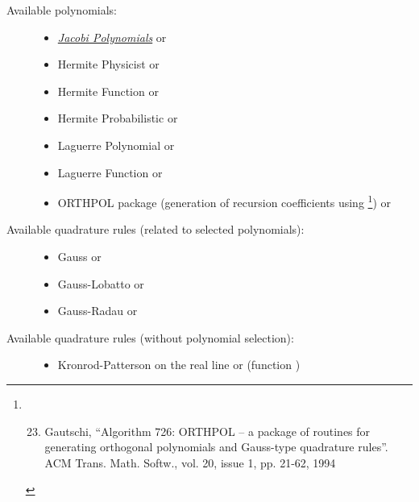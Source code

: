 \documentclass[letterpaper,10pt,english]{sphinxmanual}
\begin{document}
\begin{description}
\item[{Available polynomials:}] \leavevmode\begin{itemize}
\item {} 
{\hyperref[index:ref-jacobi]{\emph{Jacobi Polynomials}}} or 

\item {} 
Hermite Physicist or 

\item {} 
Hermite Function or 

\item {} 
Hermite Probabilistic or 

\item {} 
Laguerre Polynomial or 

\item {} 
Laguerre Function or 

\item {} 
ORTHPOL package (generation of recursion coefficients using \footnote{\begin{enumerate}
\setcounter{enumi}{22}
\item {} 
Gautschi, ``Algorithm 726: ORTHPOL -- a package of routines for generating orthogonal polynomials and Gauss-type quadrature rules''. ACM Trans. Math. Softw., vol. 20, issue 1, pp. 21-62, 1994

\end{enumerate}
})  or 

\end{itemize}

\item[{Available quadrature rules (related to selected polynomials):}] \leavevmode\begin{itemize}
\item {} 
Gauss or 

\item {} 
Gauss-Lobatto or 

\item {} 
Gauss-Radau or 

\end{itemize}

\item[{Available quadrature rules (without polynomial selection):}] \leavevmode\begin{itemize}
\item {} 
Kronrod-Patterson on the real line or  (function )


\end{itemize}
\end{description}
\end{document}
